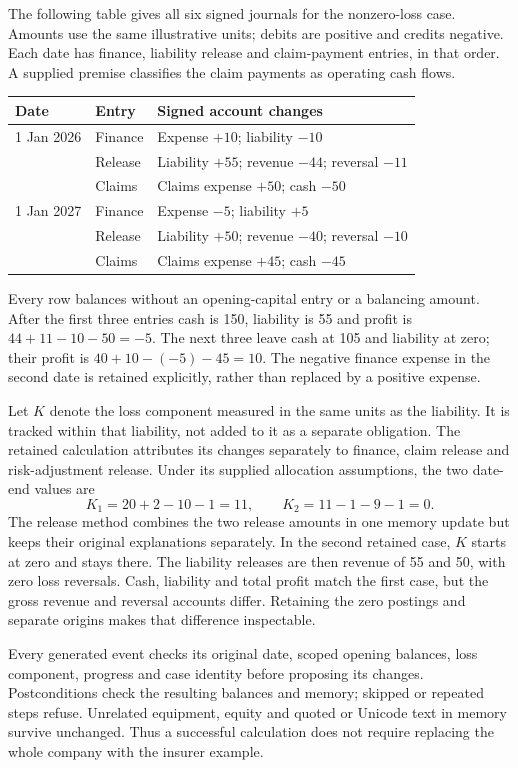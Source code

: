The following table gives all six signed journals for the nonzero-loss case.
Amounts use the same illustrative units; debits are positive and credits
negative. Each date has finance, liability release and claim-payment entries,
in that order. A supplied premise classifies the claim payments as operating
cash flows.
\begin{center}\small
\begin{tabular}{lll}
\toprule
Date & Entry & Signed account changes \\
\midrule
1 Jan 2026 & Finance & Expense $+10$; liability $-10$ \\
           & Release & Liability $+55$; revenue $-44$; reversal $-11$ \\
           & Claims  & Claims expense $+50$; cash $-50$ \\
1 Jan 2027 & Finance & Expense $-5$; liability $+5$ \\
           & Release & Liability $+50$; revenue $-40$; reversal $-10$ \\
           & Claims  & Claims expense $+45$; cash $-45$ \\
\bottomrule
\end{tabular}
\end{center}
Every row balances without an opening-capital entry or a balancing amount.
After the first three entries cash is 150, liability is 55 and profit is
$44+11-10-50=-5$. The next three leave cash at 105 and liability at zero;
their profit is $40+10-(-5)-45=10$. The negative finance expense in the second
date is retained explicitly, rather than replaced by a positive expense.

Let $K$ denote the loss component measured in the same units as the liability.
It is tracked within that liability, not added to it as a separate obligation.
The retained calculation attributes its changes separately to finance, claim
release and risk-adjustment release. Under its supplied allocation assumptions,
the two date-end values are
\[
  K_1=20+2-10-1=11,\qquad
  K_2=11-1-9-1=0.
\]
The release method combines the two release amounts in one memory update but
keeps their original explanations separately. In the second retained case,
$K$ starts at zero and stays there. The liability releases are then revenue
of 55 and 50, with zero loss reversals. Cash, liability and total profit match
the first case, but the gross revenue and reversal accounts differ. Retaining
the zero postings and separate origins makes that difference inspectable.

Every generated event checks its original date, scoped opening balances,
loss component, progress and case identity before proposing its changes.
Postconditions check the resulting balances and memory; skipped or repeated
steps refuse. Unrelated equipment, equity and quoted or Unicode text in memory
survive unchanged. Thus a successful calculation does not require replacing
the whole company with the insurer example.

